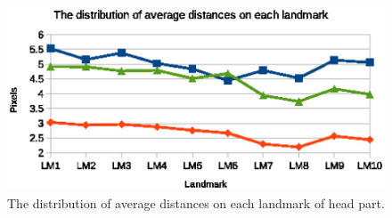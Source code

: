 \documentclass[review]{elsarticle}
\begin{document}
\begin{figure}[htbp]
	\centerline{\includegraphics[scale=0.55]{images/head_part}}
	\caption{The distribution of average distances on each landmark of head part.}
	\label{figdisthead}
\end{figure}
\fi
\end{document}
